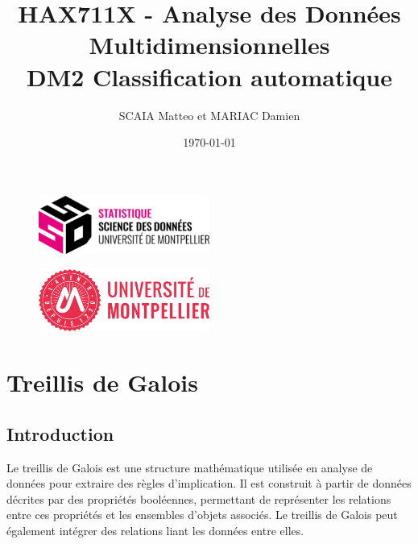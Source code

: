 \documentclass{article}
\title{HAX711X - Analyse des Données Multidimensionnelles \\ DM2 Classification automatique}
\author{SCAIA Matteo et MARIAC Damien}
\date{\today}
\begin{document}
\maketitle

\begin{figure}[h] 
    \centering
    \includegraphics[width=0.5\textwidth]{ssd_logo.png} 
\end{figure}

\begin{figure}[h] 
    \centering
    \includegraphics[width=0.5\textwidth]{logo_um_2022_rouge_RVB.png} 
\end{figure}

\newpage

\tableofcontents

\newpage
\section{Treillis de Galois}
\subsection{Introduction}
Le treillis de Galois est une structure mathématique utilisée en analyse de données pour extraire des règles d’implication. Il est construit à partir de données décrites par des propriétés booléennes, permettant de représenter les relations entre ces propriétés et les ensembles d’objets associés. 
Le treillis de Galois peut également intégrer des relations liant les données entre elles.
\end{document}

